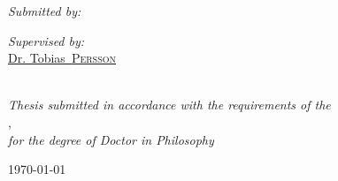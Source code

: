 \begin{titlepage}
\begin{center}
\begin{minipage}[t]{0.4\textwidth}
\begin{flushleft} \large
\emph{Submitted by:}\\
\href{https://orcid.org/my-orcid?orcid=0000-0001-8012-1440}{\authorname} %
\end{flushleft}
\end{minipage}
\begin{minipage}[t]{0.4\textwidth}
\begin{flushright} \large
\emph{Supervised by:}\\
\href{https://www.researchgate.net/profile/Tobias-Persson}{Dr. Tobias~\textsc{Persson}}\\
\href{https://orcid.org/0000-0001-7085-0973}{\supname}\\
\end{flushright}
\end{minipage}

\vspace{1.5cm}

\vfill

\large \textit{Thesis submitted in accordance with the requirements of the\\}
\univname, \ \deptname \\
\large \textit{for the degree of Doctor in Philosophy}
    
\vfill

{\large \today}\\[4.5cm] %
    
\vfill
\end{center}
\end{titlepage}